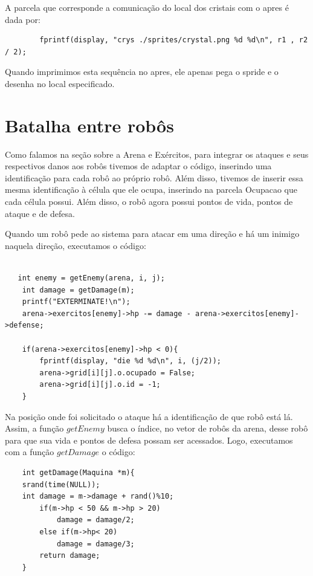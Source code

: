 \documentclass{article}
\begin{document}
    A parcela que corresponde a comunicação do local dos cristais com o apres é dada por:
    
    \begin{lstlisting}
        fprintf(display, "crys ./sprites/crystal.png %d %d\n", r1 , r2 / 2);
    \end{lstlisting}
    
    Quando imprimimos esta sequência no apres, ele apenas pega o spride e o desenha no local especificado.
    
    \section{Batalha entre robôs}
    Como falamos na seção sobre a Arena e Exércitos, para integrar os ataques e seus respectivos danos aos robôs tivemos de adaptar o código, inserindo uma identificação para cada robô ao próprio robô. Além disso, tivemos de inserir essa mesma identificação à célula que ele ocupa, inserindo na parcela Ocupacao que cada célula possui. Além disso, o robô agora possui pontos de vida, pontos de ataque e de defesa. 
    
    Quando um robô pede ao sistema para atacar em uma direção e há um inimigo naquela direção, executamos o código:
    
    \begin{lstlisting}
    
   int enemy = getEnemy(arena, i, j);
	int damage = getDamage(m);
	printf("EXTERMINATE!\n");
	arena->exercitos[enemy]->hp -= damage - arena->exercitos[enemy]->defense;
		
	if(arena->exercitos[enemy]->hp < 0){
		fprintf(display, "die %d %d\n", i, (j/2));
		arena->grid[i][j].o.ocupado = False;
		arena->grid[i][j].o.id = -1;
	}
    \end{lstlisting}
    
    Na posição onde foi solicitado o ataque há a identificação de que robô está lá. Assim, a função $getEnemy$ busca o índice, no vetor de robôs da arena, desse robô para que sua vida e pontos de defesa possam ser acessados. Logo, executamos com a função $getDamage$ o código:
    
    \begin{lstlisting}
    int getDamage(Maquina *m){
	srand(time(NULL));
	int damage = m->damage + rand()%10;
	    if(m->hp < 50 && m->hp > 20)
	    	damage = damage/2;
	    else if(m->hp< 20)
	    	damage = damage/3;
	    return damage;
    }

    \end{lstlisting}
    
\end{document}
